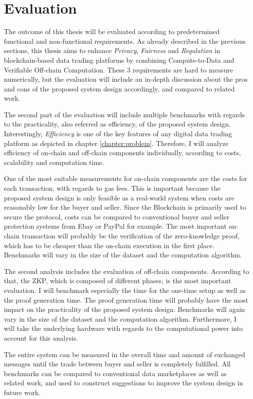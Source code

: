 \chapter{Evaluation}
\label{cha:evaluation}

The outcome of this thesis will be evaluated according to predetermined functional and non-functional requirements. As already described in the previous sections, this thesis aims to enhance \emph{Privacy}, \emph{Fairness} and \emph{Regulation} in blockchain-based data trading platforms by combining Compute-to-Data and Verifiable Off-chain Computation. These 3 requirements are hard to measure numerically, but the evaluation will include an in-depth discussion about the pros and cons of the proposed system design accordingly, and compared to related work. %

The second part of the evaluation will include multiple benchmarks with regards to the practicality, also referred as efficiency, of the proposed system design. Interestingly, \emph{Efficiency} is one of the key features of any digital data trading platform as depicted in chapter \ref{chapter:problem}. %
Therefore, I will analyze efficiency of on-chain and off-chain components individually, according to costs, scalability and computation time.

One of the most suitable measurements for on-chain components are the costs for each transaction, with regards to gas fees. This is important because the proposed system design is only feasible as a real-world system when costs are reasonably low for the buyer and seller. Since the Blockchain is primarily used to secure the protocol, costs can be compared to conventional buyer and seller protection systems from Ebay or PayPal for example. The most important on-chain transaction will probably be the verification of the zero-knowledge proof, which has to be cheaper than the on-chain execution in the first place. Benchmarks will vary in the size of the dataset and the computation algorithm.

The second analysis includes the evaluation of off-chain components. According to that, the ZKP, which is composed of different phases, is the most important evaluation. I will benchmark especially the time for the one-time setup as well as the proof generation time. The proof generation time will probably have the most impact on the practicality of the proposed system design. Benchmarks will again vary in the size of the dataset and the computation algorithm. Furthermore, I will take the underlying hardware with regards to the computational power into account for this analysis. 

The entire system can be measured in the overall time and amount of exchanged messages until the trade between buyer and seller is completely fulfilled. All benchmarks can be compared to conventional data marketplaces as well as related work, and used to construct suggestions to improve the system design in future work.
